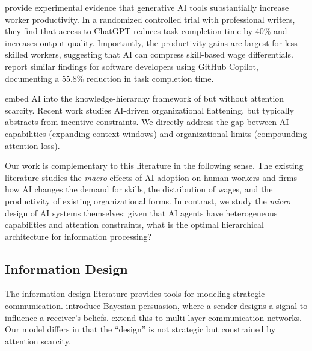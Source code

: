 \citet{noy2023experimental} provide experimental evidence that generative AI tools substantially increase worker productivity. In a randomized controlled trial with professional writers, they find that access to ChatGPT reduces task completion time by 40\% and increases output quality. Importantly, the productivity gains are largest for less-skilled workers, suggesting that AI can compress skill-based wage differentials. \citet{peng2023impact} report similar findings for software developers using GitHub Copilot, documenting a 55.8\% reduction in task completion time.

\citet{ide2025ai} embed AI into the knowledge-hierarchy framework of \citet{garicano2000hierarchies} but without attention scarcity. Recent work studies AI-driven organizational flattening, but typically abstracts from incentive constraints. We directly address the gap between AI capabilities (expanding context windows) and organizational limits (compounding attention loss).

Our work is complementary to this literature in the following sense. The existing literature studies the \emph{macro} effects of AI adoption on human workers and firms---how AI changes the demand for skills, the distribution of wages, and the productivity of existing organizational forms. In contrast, we study the \emph{micro} design of AI systems themselves: given that AI agents have heterogeneous capabilities and attention constraints, what is the optimal hierarchical architecture for information processing?

\subsection{Information Design}

The information design literature provides tools for modeling strategic communication. \citet{kamenica2011bayesian} introduce Bayesian persuasion, where a sender designs a signal to influence a receiver's beliefs. \citet{lien2019hierarchies} extend this to multi-layer communication networks. Our model differs in that the ``design'' is not strategic but constrained by attention scarcity.

